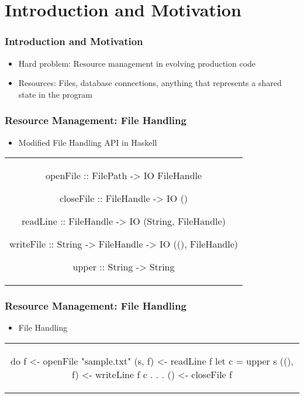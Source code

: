 \section{Introduction and Motivation}\label{sec:introduction}


\begin{frame}
\frametitle{Introduction and Motivation}
\begin{itemize}
\item Hard problem: Resource management in evolving production code
\item Resources: Files, database connections, anything that represents a shared state in the program
\end{itemize}
\end{frame}

\begin{frame}[fragile]
  \frametitle{Resource Management: File Handling}
  \begin{center}
    \begin{itemize}
    \item Modified File Handling API in Haskell
    \end{itemize}
    \begin{tabular}[h]{c}
      \begin{haskell}
     openFile  :: FilePath   -> IO FileHandle

     closeFile :: FileHandle -> IO ()

     readLine  :: FileHandle -> IO (String, FileHandle)

     writeFile :: String     -> FileHandle
                             -> IO ((), FileHandle)


     upper     :: String     -> String
      \end{haskell}
    \end{tabular}
\end{center}
\end{frame}

\begin{frame}[fragile]
  \frametitle{Resource Management: File Handling}
  \begin{center}
    \begin{itemize}
    \item File Handling
    \end{itemize}
    \begin{tabular}[h]{c}
      \begin{haskell}
        do f  <- openFile "sample.txt"
           (s, f)  <- readLine f
           let c = upper s
           ((), f) <- writeLine f c
                  .
                  .
                  .
           () <- closeFile f
      \end{haskell}
    \end{tabular}
  \end{center}
\end{frame}

